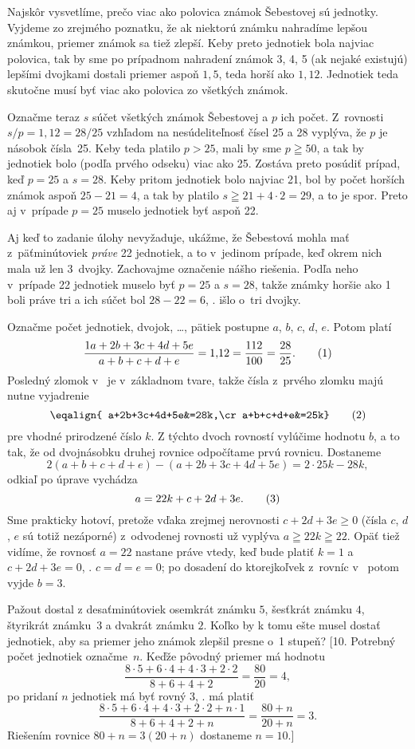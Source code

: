 {%
Najskôr vysvetlíme, prečo viac ako polovica známok Šebestovej sú
jednotky. Vyjdeme zo zrejmého poznatku, že ak niektorú známku
nahradíme lepšou známkou, priemer známok sa tiež zlepší. Keby preto
jednotiek bola najviac polovica, tak by sme po prípadnom nahradení
známok 3, 4, 5 (ak nejaké existujú) lepšími dvojkami dostali
priemer aspoň $1{,}5$, teda horší ako $1{,}12$. Jednotiek teda
skutočne musí byť viac ako polovica zo všetkých známok.

Označme teraz $s$ súčet všetkých známok Šebestovej a $p$ ich
počet. Z~rovnosti $s/p=1{,}12=28/25$ vzhľadom
na nesúdeliteľnosť čísel 25 a 28 vyplýva, že $p$ je násobok čísla~25.
Keby teda platilo $p>25$, mali by sme $p\geqq50$, a tak by jednotiek
bolo (podľa prvého odseku) viac ako 25. Zostáva preto posúdiť
prípad, keď $p=25$ a $s=28$. Keby pritom jednotiek bolo najviac
21, bol by počet horších známok aspoň $25-21=4$, a tak by
platilo $s\geqq21+4\cdot2=29$, a to je spor. Preto aj v~prípade
$p=25$ muselo jednotiek byť aspoň 22.

\poznamka
Aj keď to zadanie úlohy nevyžaduje, ukážme, že
Šebestová mohla mať z~päťminútoviek {\it práve\/} 22 jednotiek, a
to v~jedinom prípade, keď okrem nich mala už len 3~dvojky.
Zachovajme označenie nášho riešenia. Podľa neho v~prípade 22
jednotiek muselo byť $p=25$ a $s=28$, takže známky horšie ako 1 boli
práve tri a ich súčet bol $28-22=6$, \tj. išlo o~tri dvojky.

\ineriesenie
Označme počet jednotiek, dvojok, \dots, pätiek postupne
$a$, $b$, $c$, $d$, $e$. Potom platí
$$
\frac{1a+2b+3c+4d+5e}{a+b+c+d+e}=1{,}12=\frac{112}{100}=\frac{28}{25}.
\tag1
$$
Posledný zlomok v~ je v~základnom tvare, takže čísla
z~prvého zlomku majú nutne vyjadrenie
$$\eqalign{
a+2b+3c+4d+5e&=28k,\cr
a+b+c+d+e&=25k}
\tag2
$$
pre vhodné prirodzené číslo $k$.
Z týchto dvoch rovností vylúčime
hodnotu $b$, a to tak, že od dvojnásobku druhej rovnice
odpočítame prvú rovnicu. Dostaneme
$$
2(a+b+c+d+e)-(a+2b+3c+4d+5e)=2\cdot25k-28k,
$$
odkiaľ po úprave vychádza
$$
a=22k+c+2d+3e.
\tag3
$$
Sme prakticky hotoví, pretože vďaka zrejmej nerovnosti $c+2d+3e\geq0$
(čísla $c$, $d$, $e$ sú totiž nezáporné) z~odvodenej rovnosti 
už vyplýva $a\geqq22k\geqq22$. Opäť tiež vidíme, že rovnosť
$a=22$ nastane práve vtedy, keď bude platiť $k=1$ a $c+2d+3e=0$, \tj.
$c=d=e=0$; po dosadení do ktorejkoľvek z~rovníc v~ potom vyjde $b=3$.

Pažout dostal z desaťminútoviek osemkrát známku $5$, šesťkrát
známku $4$, štyrikrát známku~$3$ a dvakrát známku $2$.
Koľko by k tomu ešte musel dostať jednotiek,
aby sa priemer jeho známok zlepšil presne o~1 stupeň?
[10. Potrebný počet jednotiek označme~$n$. Keďže pôvodný priemer má
hodnotu
$$
\frac{8\cdot 5+6\cdot 4+4\cdot 3+2\cdot
2}{8+6+4+2}=\frac{80}{20}=4,
$$
po pridaní $n$ jednotiek má byť rovný 3, \tj. má platiť
$$
\frac{8\cdot 5+6\cdot 4+4\cdot 3+2\cdot 2+n\cdot1}{8+6+4+2+n}
=\frac{80+n}{20+n}=3.
$$
Riešením rovnice $80+n=3(20+n)$ dostaneme $n=10$.]

}
